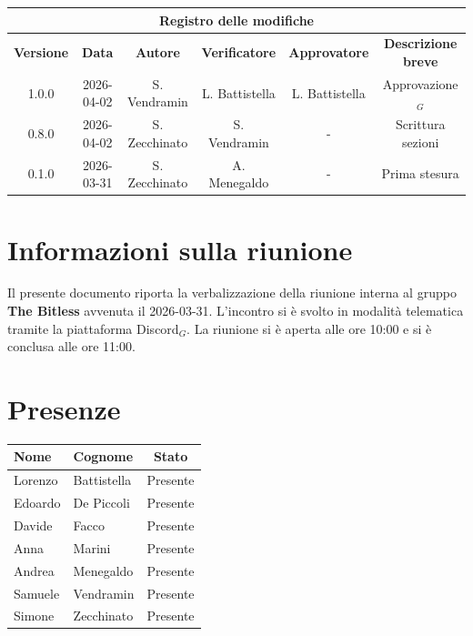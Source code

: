\documentclass[a4paper, 10pt, colorlinks=true, linkcolor=black, urlcolor=blue, citecolor=blue, hidelinks]{article}
\begin{document}
\newcommand{\tipoverbale}{interno}
\newcommand{\dataverbale}{2026-03-31}
\newcommand{\dataversione}{2026-04-02}
\newcommand{\versione}{1.0.0}
\newcommand{\stato}{Approvato}
\newcommand{\destinatari}{The Bitless, prof. Tullio Vardanega, prof. Riccardo Cardin}

\begin{titlepage}
\end{titlepage}

\newpage
{}

\begin{center}
    \begin{tabular}{|c|c|c|c|c|c|}
        \hline
        \multicolumn{6}{|c|}{\textbf{Registro delle modifiche}} \\
        \hline
        \textbf{Versione} & \textbf{Data} & \textbf{Autore} & \textbf{Verificatore} & \textbf{Approvatore} & \textbf{Descrizione breve} \\
        \hline
        1.0.0 & 2026-04-02 & S. Vendramin &  L. Battistella &  L. Battistella & Approvazione$_G$ \\
        0.8.0 & 2026-04-02 & S. Zecchinato & S. Vendramin & - & Scrittura sezioni \\
        0.1.0 & 2026-03-31 & S. Zecchinato & A. Menegaldo & - & Prima stesura \\
        \hline
    \end{tabular}
\end{center}

\newpage
\tableofcontents 

\newpage
\section{Informazioni sulla riunione}
Il presente documento riporta la verbalizzazione della riunione interna al gruppo \textbf{The Bitless} avvenuta il \dataverbale{}. L'incontro si è svolto in modalità telematica tramite la piattaforma Discord$_G$. La riunione si è aperta alle ore 10:00 e si è conclusa alle ore 11:00.

\section{Presenze}
\begin{center}
\begin{tabular}{|l|l|c|}
\hline
\textbf{Nome} & \textbf{Cognome} & \textbf{Stato} \\
\hline
Lorenzo & Battistella & Presente \\
Edoardo & De Piccoli & Presente \\
Davide & Facco & Presente \\
Anna & Marini & Presente \\
Andrea & Menegaldo & Presente \\
Samuele & Vendramin & Presente \\
Simone & Zecchinato & Presente \\
\hline
\end{tabular}
\end{center}
\end{document}
